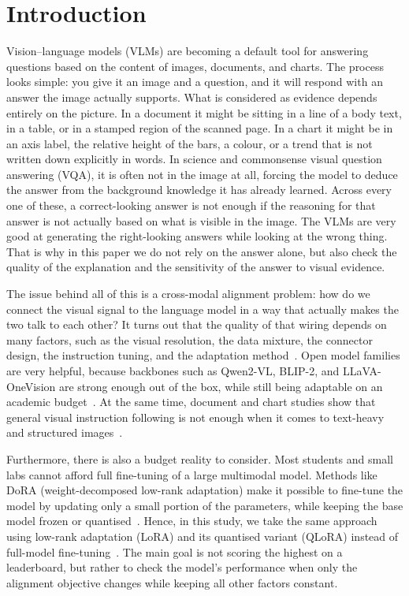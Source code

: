 \documentclass[preprint,12pt]{elsarticle}
\begin{document}
\section{Introduction}
Vision--language models (VLMs) are becoming a default tool for answering questions based on the content of images, documents, and charts.
The process looks simple: you give it an image and a question, and it will respond with an answer the image actually supports.
What is considered as evidence depends entirely on the picture. 
In a document it might be sitting in a line of a body text, in a table, or in a stamped region of the scanned page.
In a chart it might be in an axis label, the relative height of the bars, a colour, or a trend that is not written down explicitly in words.
In science and commonsense visual question answering (VQA), it is often not in the image at all, forcing the model to deduce the answer from the background knowledge it has already learned.
Across every one of these, a correct-looking answer is not enough if the reasoning for that answer is not actually based on what is visible in the image.
The VLMs are very good at generating the right-looking answers while looking at the wrong thing.
That is why in this paper we do not rely on the answer alone, but also check the quality of the explanation and the sensitivity of the answer to visual evidence.

The issue behind all of this is a cross-modal alignment problem: how do we connect the visual signal to the language model in a way that actually makes the two talk to each other?
It turns out that the quality of that wiring depends on many factors, such as the visual resolution, the data mixture, the connector design, the instruction tuning, and the adaptation method~\cite{laurencon2024whatmatters,zhang2025mm15,deitke2025molmo}.
Open model families are very helpful, because backbones such as Qwen2-VL, BLIP-2, and LLaVA-OneVision are strong enough out of the box, while still being adaptable on an academic budget~\cite{wang2024qwen2vl,li2023blip2,li2025llavaonevision}.
At the same time, document and chart studies show that general visual instruction following is not enough when it comes to text-heavy and structured images~\cite{fu2025textrichsurvey,wang2024docllm,masry2024chartinstruct,masry2025chartgemma}.

Furthermore, there is also a budget reality to consider.
Most students and small labs cannot afford full fine-tuning of a large multimodal model.
Methods like DoRA (weight-decomposed low-rank adaptation) make it possible to fine-tune the model by updating only a small portion of the parameters, while keeping the base model frozen or quantised~\cite{liu2024dora}.
Hence, in this study, we take the same approach using low-rank adaptation (LoRA) and its quantised variant (QLoRA) instead of full-model fine-tuning~\cite{hu2022lora,dettmers2023qlora}.
The main goal is not scoring the highest on a leaderboard, but rather to check the model's performance when only the alignment objective changes while keeping all other factors constant.
\end{document}
